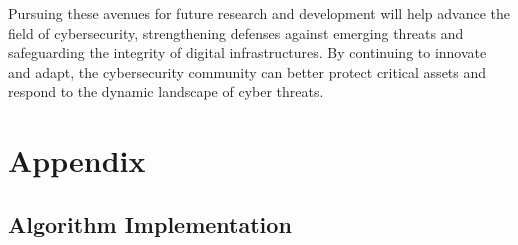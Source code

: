 Pursuing these avenues for future research and development will help advance the field of cybersecurity, strengthening defenses against emerging threats and safeguarding the integrity of digital infrastructures. By continuing to innovate and adapt, the cybersecurity community can better protect critical assets and respond to the dynamic landscape of cyber threats.

\appendix %
\chapter{Appendix} %

\section{Algorithm Implementation} %

